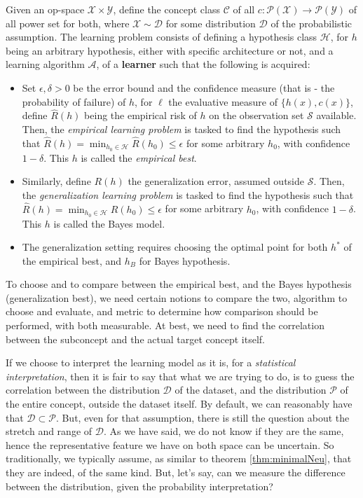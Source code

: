 \begin{setting}
    Given an op-space $\mathcal{X}\times\mathcal{Y}$, define the concept class $\mathcal{C}$ of all $c: \mathcal{P}(\mathcal{X})\to \mathcal{P}(\mathcal{Y})$ of all power set for both, where $\mathcal{X}\sim \mathcal{D}$ for some distribution $\mathcal{D}$ of the probabilistic assumption. The learning problem consists of defining a hypothesis class $\mathcal{H}$, for $h$ being an arbitrary hypothesis, either with specific architecture or not, and a learning algorithm $\mathcal{A}$, of a \textbf{learner} such that the following is acquired: 
    \begin{itemize}
        \item Set $\epsilon,\delta> 0$ be the error bound and the confidence measure (that is - the probability of failure) of $h$, for $\ell$ the evaluative measure of $\{h(x),c(x)\}$, define $\hat{R}(h)$ being the empirical risk of $h$ on the observation set $\mathcal{S}$ available. Then, the \textit{empirical learning problem} is tasked to find the hypothesis such that $\hat{R}(h) = \min_{h_{0}\in \mathcal{H}}\hat{R}(h_{0})\leq \epsilon$ for some arbitrary $h_{0}$, with confidence $1-\delta$. This $h$ is called the \textit{empirical best}. 
        \item Similarly, define $R(h)$ the generalization error, assumed outside $\mathcal{S}$. Then, the \textit{generalization learning problem} is tasked to find the hypothesis such that $\hat{R}(h) = \min_{h_{0}\in \mathcal{H}}R(h_{0})\leq \epsilon$ for some arbitrary $h_{0}$, with confidence $1-\delta$. This $h$ is called the Bayes model. 
        \item The generalization setting requires choosing the optimal point for both $h^{*}$ of the empirical best, and $h_{B}$ for Bayes hypothesis. 
    \end{itemize} 
\end{setting}
To choose and to compare between the empirical best, and the Bayes hypothesis (generalization best), we need certain notions to compare the two, algorithm to choose and evaluate, and metric to determine how comparison should be performed, with both measurable. At best, we need to find the correlation between the subconcept and the actual target concept itself. 

If we choose to interpret the learning model as it is, for a \textit{statistical interpretation}, then it is fair to say that what we are trying to do, is to guess the correlation between the distribution $\mathcal{D}$ of the dataset, and the distribution $\mathcal{P}$ of the entire concept, outside the dataset itself. By default, we can reasonably have that $\mathcal{D}\subset \mathcal{P}$. But, even for that assumption, there is still the question about the stretch and range of $\mathcal{D}$. As we have said, we do not know if they are the same, hence the representative feature we have on both space can be uncertain. So traditionally, we typically assume, as similar to theorem \ref{thm:minimalNeu}, that they are indeed, of the same kind. But, let's say, can we measure the difference between the distribution, given the probability interpretation? 


